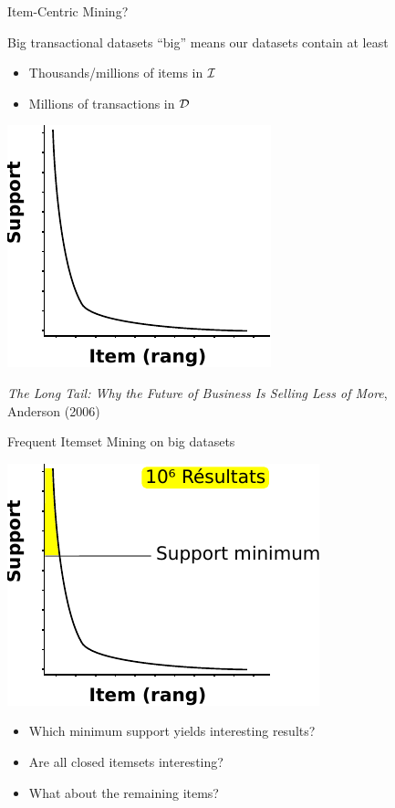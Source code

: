 \documentclass[table]{beamer}
\begin{document}
\begin{frame}
  Item-Centric Mining?
\end{frame}

\begin{frame}[t]{Big transactional datasets}
  ``big'' means our datasets contain at least
  \begin{itemize}
    \item Thousands/millions of items in $\cal I$
    \item Millions of transactions in $\cal D$
  \end{itemize}
  \pause
  \begin{center}
    \includegraphics[width=.5\linewidth]{fig/freq_distrib.pdf}
  \end{center}
  \begin{footnotesize}
    [2] {\em The Long Tail: Why the Future of Business Is Selling Less of More},
    \\ Anderson (2006)
  \end{footnotesize}
\end{frame}


\begin{frame}[t]{Frequent Itemset Mining on big datasets}
  \begin{center}
    \includegraphics[width=.5\linewidth]{fig/freq_distrib_standard.pdf}
  \end{center}
  \begin{itemize}
    \item Which minimum support yields interesting results?
    \pause
    \item Are all closed itemsets interesting?
    \pause
    \item What about the remaining items?
  \end{itemize}
\end{frame}
\end{document}
